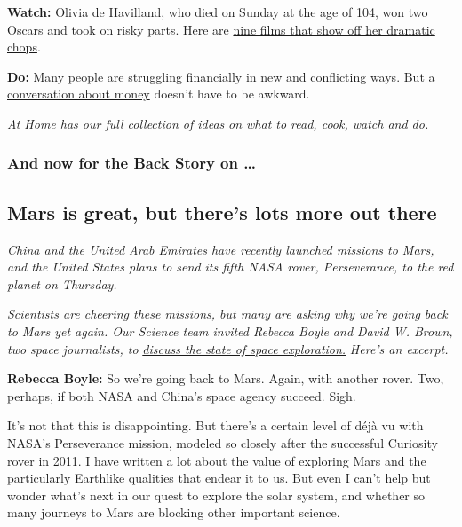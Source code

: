 \textbf{Watch:} Olivia de Havilland, who died on Sunday at the age of
104, won two Oscars and took on risky parts. Here are
\href{https://www.nytimes.com/2020/07/26/arts/olivia-de-havilland-movies-stream.html}{nine
films that show off her dramatic chops}.

\textbf{Do:} Many people are struggling financially in new and
conflicting ways. But a
\href{https://www.nytimes.com/2020/07/25/style/how-to-talk-to-friends-about-money.html?action=click\&module=RelatedLinks\&pgtype=collection}{conversation
about money} doesn't have to be awkward.

\href{https://www.nytimes.com/spotlight/at-home}{\emph{At Home has our
full collection of ideas}} \emph{on what to read, cook, watch and do.}

\hypertarget{and-now-for-the-back-story-on-}{%
\subsubsection{And now for the Back Story on
\ldots{}}\label{and-now-for-the-back-story-on-}}

\hypertarget{mars-is-great-but-theres-lots-more-out-there}{%
\subsection{Mars is great, but there's lots more out
there}\label{mars-is-great-but-theres-lots-more-out-there}}

\emph{China and the United Arab Emirates have recently launched missions
to Mars, and the United States plans to send its fifth NASA rover,
Perseverance, to the red planet on Thursday.}

\emph{Scientists are cheering these missions, but many are asking why
we're going back to Mars yet again. Our Science team invited Rebecca
Boyle and David W. Brown, two space journalists, to}
\href{https://www.nytimes.com/2020/07/28/science/mars-nasa-science.html}{\emph{discuss
the state of space exploration.}} \emph{Here's an excerpt.}

\textbf{Rebecca Boyle:} So we're going back to Mars. Again, with another
rover. Two, perhaps, if both NASA and China's space agency succeed.
Sigh.

It's not that this is disappointing. But there's a certain level of déjà
vu with NASA's Perseverance mission, modeled so closely after the
successful Curiosity rover in 2011. I have written a lot about the value
of exploring Mars and the particularly Earthlike qualities that endear
it to us. But even I can't help but wonder what's next in our quest to
explore the solar system, and whether so many journeys to Mars are
blocking other important science.

